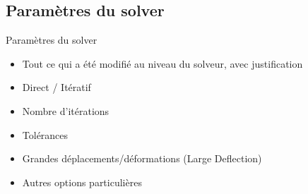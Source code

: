\subsection{Paramètres du solver}
\label{sec:Paramètres du solver}

\begin{frame}[c]{Paramètres du solver}
    \begin{itemize}
        \item Tout ce qui a été modifié au niveau du solveur, avec justification
        \item Direct / Itératif
        \item Nombre d'itérations
        \item Tolérances
        \item Grandes déplacements/déformations (Large Deflection)
        \item Autres options particulières
    \end{itemize}
\end{frame}